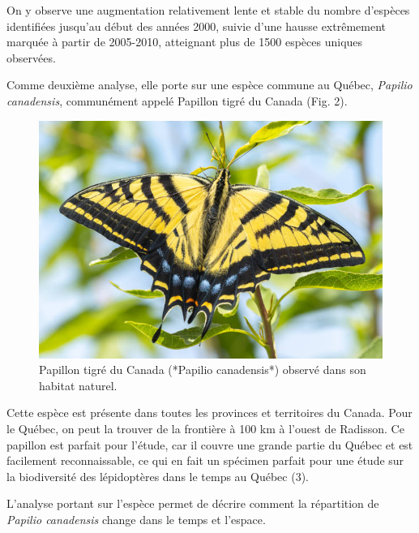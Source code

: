 \documentclass[9pt,twocolumn,twoside,]{pnas-new}
\begin{document}
On y observe une augmentation relativement lente et stable du nombre
d'espèces identifiées jusqu'au début des années 2000, suivie d'une
hausse extrêmement marquée à partir de 2005-2010, atteignant plus de
1500 espèces uniques observées.

Comme deuxième analyse, elle porte sur une espèce commune au Québec,
\emph{Papilio canadensis}, communément appelé Papillon tigré du Canada
(Fig. 2).

\begin{figure}

{\centering \includegraphics[width=0.8\linewidth]{Papilio_canadensis} 

}

\caption{Papillon tigré du Canada (*Papilio canadensis*) observé dans son habitat naturel.}\label{fig:fig-papilio}
\end{figure}

Cette espèce est présente dans toutes les provinces et territoires du
Canada. Pour le Québec, on peut la trouver de la frontière à 100 km à
l'ouest de Radisson. Ce papillon est parfait pour l'étude, car il couvre
une grande partie du Québec et est facilement reconnaissable, ce qui en
fait un spécimen parfait pour une étude sur la biodiversité des
lépidoptères dans le temps au Québec (3).

L'analyse portant sur l'espèce permet de décrire comment la répartition
de \emph{Papilio canadensis} change dans le temps et l'espace.
\end{document}
